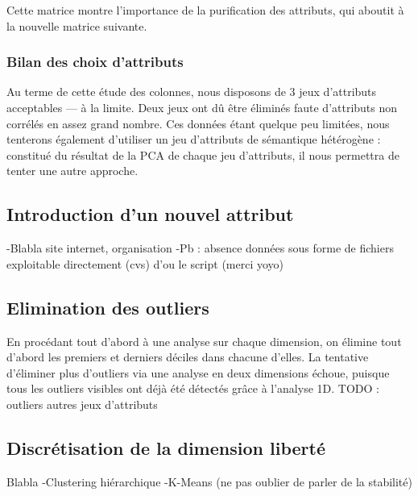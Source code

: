 Cette matrice montre l'importance de la purification des attributs, qui aboutit à la nouvelle matrice suivante.

\subsubsection{Bilan des choix d'attributs}
Au terme de cette étude des colonnes, nous disposons de 3 jeux d'attributs acceptables --- à la limite. Deux jeux ont dû être éliminés faute d'attributs non corrélés en assez grand nombre. Ces données étant quelque peu limitées, nous tenterons également d'utiliser un jeu d'attributs de sémantique hétérogène : constitué du résultat de la PCA de chaque jeu d'attributs, il nous permettra de tenter une autre approche.

\subsection{Introduction d'un nouvel attribut}

 
-Blabla site internet, organisation
-Pb : absence données sous forme de fichiers exploitable directement (cvs) d'ou le script (merci yoyo)

\subsection{Elimination des outliers}
En procédant tout d'abord à une analyse sur chaque dimension, on élimine tout d'abord les premiers et derniers déciles dans chacune d'elles.
La tentative d'éliminer plus d'outliers via une analyse en deux dimensions échoue, puisque tous les outliers visibles ont déjà été détectés grâce à l'analyse 1D.
{\huge TODO : outliers autres jeux d'attributs}

\subsection{Discrétisation de la dimension \og liberté \fg}
Blabla
-Clustering hiérarchique
-K-Means (ne pas oublier de parler de la stabilité)

